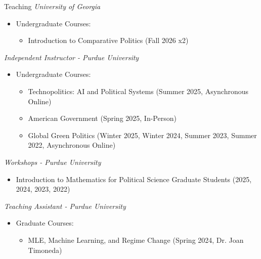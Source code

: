 \documentclass{resume} %
\begin{document}
\newpage
\begin{rSection}{Teaching} %
{\it University of Georgia}
\begin{itemize}
    \item Undergraduate Courses:
    \begin{itemize}
        \item Introduction to Comparative Politics (Fall 2026 x2)
    \end{itemize}
\end{itemize}


{\it Independent Instructor - Purdue University}
\begin{itemize}
    \item Undergraduate Courses:
    \begin{itemize}
    \item Technopolitics: AI and Political Systems (Summer 2025, Asynchronous Online)
    \item American Government (Spring 2025, In-Person)
    \item Global Green Politics (Winter 2025, Winter 2024, Summer 2023, Summer 2022, Asynchronous Online)
    \end{itemize}
\end{itemize}



{\it Workshops - Purdue University}
\begin{itemize}
    \item Introduction to Mathematics for Political Science Graduate Students (2025, 2024, 2023, 2022)
\end{itemize}

{\it Teaching Assistant - Purdue University}
\begin{itemize}
    \item Graduate Courses:
    \begin{itemize}

    \item MLE, Machine Learning, and Regime Change (Spring 2024, Dr. Joan Timoneda)
    \end{itemize}


\end{itemize}
\end{rSection}
\end{document}
